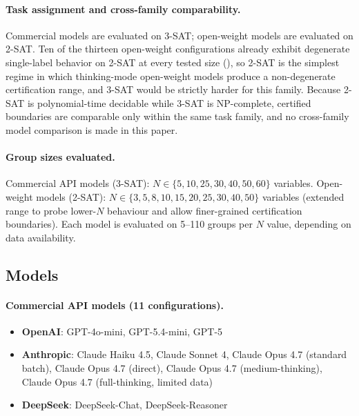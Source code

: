 \documentclass[conference]{IEEEtran}
\theoremstyle{remark}
\begin{document}
\paragraph{Task assignment and cross-family comparability.}
Commercial models are evaluated on 3-SAT; open-weight models are evaluated on 2-SAT.
Ten of the thirteen open-weight configurations already exhibit degenerate single-label behavior on 2-SAT at every tested size (), so 2-SAT is the simplest regime in which thinking-mode open-weight models produce a non-degenerate certification range, and 3-SAT would be strictly harder for this family.
Because 2-SAT is polynomial-time decidable while 3-SAT is NP-complete, certified boundaries are comparable only within the same task family, and no cross-family model comparison is made in this paper.

\paragraph{Group sizes evaluated.}
Commercial API models (3-SAT): $N \in \{5, 10, 25, 30, 40, 50, 60\}$ variables.
Open-weight models (2-SAT): $N \in \{3, 5, 8, 10, 15, 20, 25, 30, 40, 50\}$ variables (extended range to probe lower-$N$ behaviour and allow finer-grained certification boundaries).
Each model is evaluated on 5--110 groups per $N$ value, depending on data availability.

\subsection{Models}

\paragraph{Commercial API models (11 configurations).}
\begin{itemize}[leftmargin=*, itemsep=2pt]
\item \textbf{OpenAI}: GPT-4o-mini, GPT-5.4-mini, GPT-5
\item \textbf{Anthropic}: Claude Haiku 4.5, Claude Sonnet 4, Claude Opus 4.7 (standard batch), Claude Opus 4.7 (direct), Claude Opus 4.7 (medium-thinking), Claude Opus 4.7 (full-thinking, limited data)
\item \textbf{DeepSeek}: DeepSeek-Chat, DeepSeek-Reasoner
\end{itemize}
\end{document}
